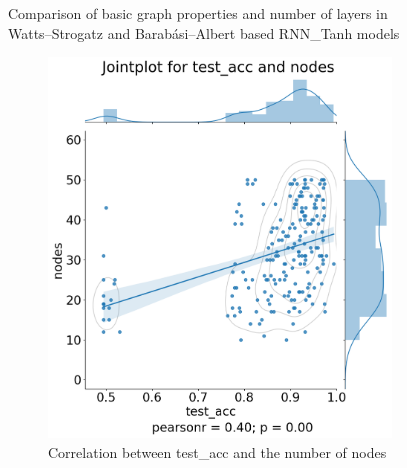 \begin{figure}[H]
\caption[Comparison of basic graph properties and number of layers in WS and BA based RNN\_Tanh models]{Comparison of basic graph properties and number of layers in Watts–Strogatz and Barabási–Albert based RNN\_Tanh models} \label{fig:tanh_graphs}
\end{figure}

\begin{figure}[H]
    \centering
    \begin{subfigure}{0.45\textwidth}
        \includegraphics[width=\linewidth]{images/results/random/tanh/jointplot_test_acc_nodes.png}
        \caption{Correlation between test\_acc and the number of nodes} \label{fig:jp_tanh_node}
    \end{subfigure}%
    \hfill
    \begin{subfigure}{0.45\textwidth}

\end{subfigure}
\end{figure}
